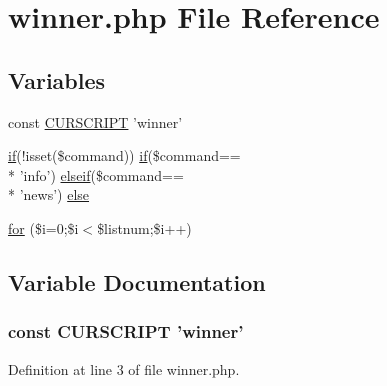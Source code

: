 \hypertarget{winner_8php}{\section{winner.\+php File Reference}
\label{winner_8php}
}
\subsection*{Variables}
\begin{DoxyCompactItemize}
\item 
const \hyperlink{winner_8php_a39c39f525eceb86cabc338804f230e80}{C\+U\+R\+S\+C\+R\+I\+P\+T} 'winner'
\item 
\hyperlink{login__old_8php_a4ac1118c2e44c513a674bc1793ba6c90}{if}(!isset(\$command)) \hyperlink{login__old_8php_a4ac1118c2e44c513a674bc1793ba6c90}{if}(\$command== \\*
'info') \hyperlink{urlist_8php_a77f52b43f81ed05a41b68c2161789055}{elseif}(\$command== \\*
'news') \hyperlink{winner_8php_a7529bad1896bee85fa46286e36d1abeb}{else}
\item 
\hyperlink{winner_8php_a2059cdc4b75f7f57f2eadd00aaa9ffbe}{for} (\$i=0;\$i$<$\$listnum;\$i++)
\end{DoxyCompactItemize}


\subsection{Variable Documentation}
\hypertarget{winner_8php_a39c39f525eceb86cabc338804f230e80}{
\subsubsection[{C\+U\+R\+S\+C\+R\+I\+P\+T}]{\setlength{\rightskip}{0pt plus 5cm}const C\+U\+R\+S\+C\+R\+I\+P\+T 'winner'}}\label{winner_8php_a39c39f525eceb86cabc338804f230e80}


Definition at line 3 of file winner.\+php.

